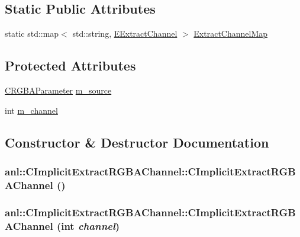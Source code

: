 \subsection*{Static Public Attributes}
\begin{DoxyCompactItemize}
\item 
static std::map$<$ std::string, \hyperlink{namespaceanl_a9bb9d0b1905b91d898e1d8a44e613d8e}{EExtractChannel} $>$ \hyperlink{classanl_1_1CImplicitExtractRGBAChannel_aa15d049fb69a69921db6c0540e2bebee}{ExtractChannelMap}
\end{DoxyCompactItemize}
\subsection*{Protected Attributes}
\begin{DoxyCompactItemize}
\item 
\hyperlink{classanl_1_1CRGBAParameter}{CRGBAParameter} \hyperlink{classanl_1_1CImplicitExtractRGBAChannel_abcc55d49cef6ddbc40ab0ee3fbcff896}{m\_\-source}
\item 
int \hyperlink{classanl_1_1CImplicitExtractRGBAChannel_aeb2ec2a72305ce11711e168cc4465b06}{m\_\-channel}
\end{DoxyCompactItemize}


\subsection{Constructor \& Destructor Documentation}
\hypertarget{classanl_1_1CImplicitExtractRGBAChannel_ae987a5fadcb5571462a26775a68f4966}{
\subsubsection[{CImplicitExtractRGBAChannel}]{\setlength{\rightskip}{0pt plus 5cm}anl::CImplicitExtractRGBAChannel::CImplicitExtractRGBAChannel ()}}
\label{classanl_1_1CImplicitExtractRGBAChannel_ae987a5fadcb5571462a26775a68f4966}
\hypertarget{classanl_1_1CImplicitExtractRGBAChannel_a05e30ebc5082c29005cefd75c8e902c1}{
\subsubsection[{CImplicitExtractRGBAChannel}]{\setlength{\rightskip}{0pt plus 5cm}anl::CImplicitExtractRGBAChannel::CImplicitExtractRGBAChannel (int {\em channel})}}
\label{classanl_1_1CImplicitExtractRGBAChannel_a05e30ebc5082c29005cefd75c8e902c1}


